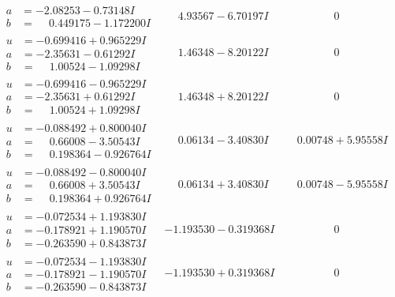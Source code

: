 \documentclass[1p]{elsarticle_modified}
\theoremstyle{definition}
\begin{document}
$$\begin{array}{c|c|c}
\begin{aligned}
a &= -2.08253 - 0.73148 I \\
b &= \phantom{-}0.449175 - 1.172200 I\end{aligned}
 & \phantom{-}4.93567 - 6.70197 I & \phantom{-0.000000 } 0 \\ \hline\begin{aligned}
u &= -0.699416 + 0.965229 I \\
a &= -2.35631 - 0.61292 I \\
b &= \phantom{-}1.00524 - 1.09298 I\end{aligned}
 & \phantom{-}1.46348 - 8.20122 I & \phantom{-0.000000 } 0 \\ \hline\begin{aligned}
u &= -0.699416 - 0.965229 I \\
a &= -2.35631 + 0.61292 I \\
b &= \phantom{-}1.00524 + 1.09298 I\end{aligned}
 & \phantom{-}1.46348 + 8.20122 I & \phantom{-0.000000 } 0 \\ \hline\begin{aligned}
u &= -0.088492 + 0.800040 I \\
a &= \phantom{-}0.66008 - 3.50543 I \\
b &= \phantom{-}0.198364 - 0.926764 I\end{aligned}
 & \phantom{-}0.06134 - 3.40830 I & \phantom{-}0.00748 + 5.95558 I \\ \hline\begin{aligned}
u &= -0.088492 - 0.800040 I \\
a &= \phantom{-}0.66008 + 3.50543 I \\
b &= \phantom{-}0.198364 + 0.926764 I\end{aligned}
 & \phantom{-}0.06134 + 3.40830 I & \phantom{-}0.00748 - 5.95558 I \\ \hline\begin{aligned}
u &= -0.072534 + 1.193830 I \\
a &= -0.178921 + 1.190570 I \\
b &= -0.263590 + 0.843873 I\end{aligned}
 & -1.193530 - 0.319368 I & \phantom{-0.000000 } 0 \\ \hline\begin{aligned}
u &= -0.072534 - 1.193830 I \\
a &= -0.178921 - 1.190570 I \\
b &= -0.263590 - 0.843873 I\end{aligned}
 & -1.193530 + 0.319368 I & \phantom{-0.000000 } 0\\

\end{array}$$
\end{document}
